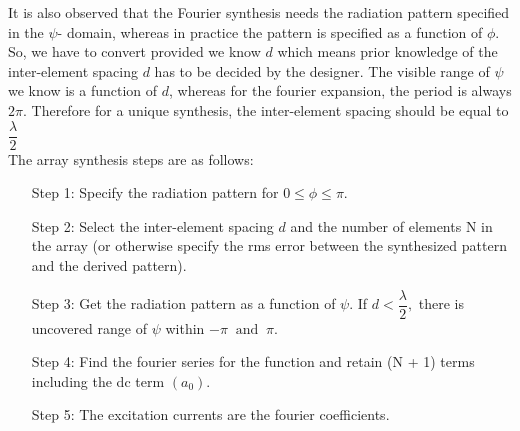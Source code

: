 It is also observed that the Fourier synthesis needs the radiation pattern specified in the $\psi$- domain, whereas in practice the pattern is specified as a function of $\phi$. So, we have to convert provided we know $d$ which means prior knowledge of the inter-element spacing $d$ has to be decided by the designer. The visible range of $\psi$ we know is a function of $d$, whereas for the fourier expansion, the period is always $2\pi$. Therefore for a unique synthesis, the inter-element spacing should be equal to $\dfrac{\lambda}{2}$\\
The array synthesis steps are as follows:
\begin{enumerate}
\item[Step 1:] Specify the radiation pattern for $0 \leq \phi \leq \pi$.
\item[Step 2:] Select the inter-element spacing $d$ and the number of elements N in the array (or otherwise specify the rms error between the synthesized pattern and the derived pattern).
\item[Step 3:] Get the radiation pattern as a function of $\psi$. If $d < \dfrac{\lambda}{2},$ there is uncovered range of $\psi$ within $-\pi \; \; \text{and} \; \; \pi$.
\item[Step 4:] Find the fourier series for the function and retain (N + 1) terms including the dc term $(a_0)$.
\item[Step 5:] The excitation currents are the fourier coefficients.
\end{enumerate}
